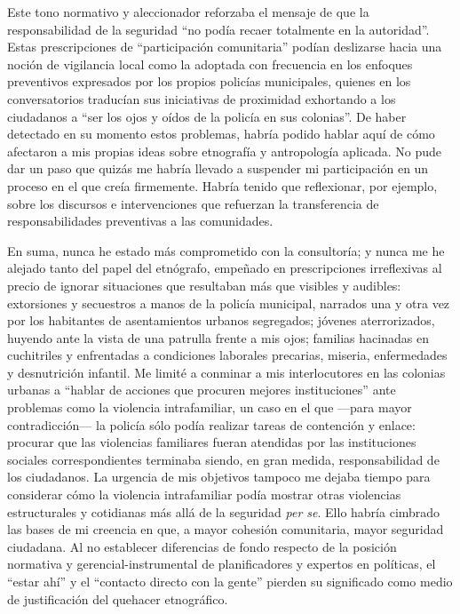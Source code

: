 \documentclass[
  spanish,
  11pt,
  a4paper,
]{scrbook}
\begin{document}
Este tono normativo y aleccionador reforzaba el mensaje de que la
responsabilidad de la seguridad ``no podía recaer totalmente en la
autoridad''. Estas prescripciones de ``participación comunitaria''
podían deslizarse hacia una noción de vigilancia local como la adoptada
con frecuencia en los enfoques preventivos expresados por los propios
policías municipales, quienes en los conversatorios traducían sus
iniciativas de proximidad exhortando a los ciudadanos a ``ser los ojos y
oídos de la policía en sus colonias''. De haber detectado en su momento
estos problemas, habría podido hablar aquí de cómo afectaron a mis
propias ideas sobre etnografía y antropología aplicada. No pude dar un
paso que quizás me habría llevado a suspender mi participación en un
proceso en el que creía firmemente. Habría tenido que reflexionar, por
ejemplo, sobre los discursos e intervenciones que refuerzan la
transferencia de responsabilidades preventivas a las comunidades.

En suma, nunca he estado más comprometido con la consultoría; y nunca me
he alejado tanto del papel del etnógrafo, empeñado en prescripciones
irreflexivas al precio de ignorar situaciones que resultaban más que
visibles y audibles: extorsiones y secuestros a manos de la policía
municipal, narrados una y otra vez por los habitantes de asentamientos
urbanos segregados; jóvenes aterrorizados, huyendo ante la vista de una
patrulla frente a mis ojos; familias hacinadas en cuchitriles y
enfrentadas a condiciones laborales precarias, miseria, enfermedades y
desnutrición infantil. Me limité a conminar a mis interlocutores en las
colonias urbanas a ``hablar de acciones que procuren mejores
instituciones'' ante problemas como la violencia intrafamiliar, un caso
en el que ---para mayor contradicción--- la policía sólo podía realizar
tareas de contención y enlace: procurar que las violencias familiares
fueran atendidas por las instituciones sociales correspondientes
terminaba siendo, en gran medida, responsabilidad de los ciudadanos. La
urgencia de mis objetivos tampoco me dejaba tiempo para considerar cómo
la violencia intrafamiliar podía mostrar otras violencias estructurales
y cotidianas más allá de la seguridad \emph{per se}. Ello habría
cimbrado las bases de mi creencia en que, a mayor cohesión comunitaria,
mayor seguridad ciudadana. Al no establecer diferencias de fondo
respecto de la posición normativa y gerencial-instrumental de
planificadores y expertos en políticas, el ``estar ahí'' y el ``contacto
directo con la gente'' pierden su significado como medio de
justificación del quehacer etnográfico.
\end{document}
